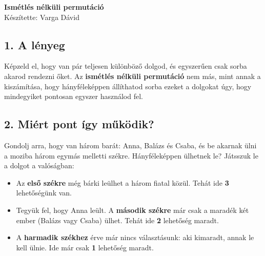 \documentclass[11pt, a4paper]{article}
\begin{document}
\begin{center}
    \LARGE \textbf{Ismétlés nélküli permutáció} \\[0.3cm]
    \large Készítette: Varga Dávid \\
    \vspace{0.5cm}
\end{center}



\vspace{0.5cm}

\subsection*{1. A lényeg}
Képzeld el, hogy van pár teljesen különböző dolgod, és egyszerűen csak sorba akarod rendezni őket. Az \textbf{ismétlés nélküli permutáció} nem más, mint annak a kiszámítása, hogy hányféleképpen állíthatod sorba ezeket a dolgokat úgy, hogy mindegyiket pontosan egyszer használod fel.

\subsection*{2. Miért pont így működik?}
Gondolj arra, hogy van három barát: Anna, Balázs és Csaba, és be akarnak ülni a moziba három egymás melletti székre. Hányféleképpen ülhetnek le? Játsszuk le a dolgot a valóságban:
\begin{itemize}
    \item Az \textbf{első székre} még bárki leülhet a három fiatal közül. Tehát ide \textbf{3} lehetőségünk van.
    \item Tegyük fel, hogy Anna leült. A \textbf{második székre} már csak a maradék két ember (Balázs vagy Csaba) ülhet. Tehát ide \textbf{2} lehetőség maradt.
    \item A \textbf{harmadik székhez} érve már nincs választásunk: aki kimaradt, annak le kell ülnie. Ide már csak \textbf{1} lehetőség maradt.
\end{itemize}
\end{document}
